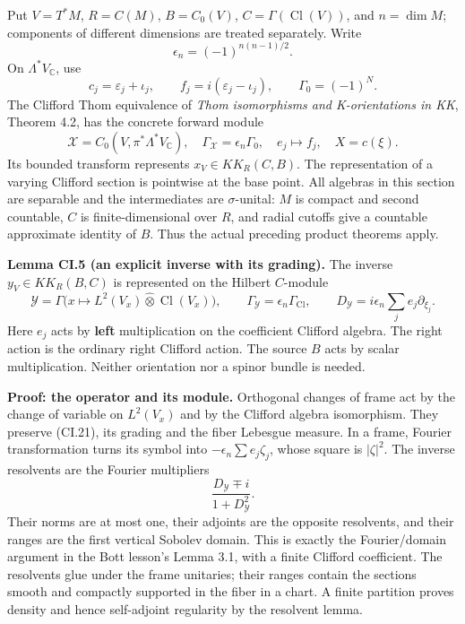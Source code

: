 \documentclass[
  11pt,
]{article}
\begin{document}
Put \(V=T^*M\), \(R=C(M)\), \(B=C_0(V)\),
\(C=\Gamma(\operatorname{Cl}(V))\), and \(n=\dim M\); components of
different dimensions are treated separately. Write \[
 \epsilon_n=(-1)^{n(n-1)/2}.
 \tag{CI.18}
\] On \(\Lambda^*V_{\mathbb C}\), use \[
 c_j=\varepsilon_j+\iota_j,\qquad
 f_j=i(\varepsilon_j-\iota_j),\qquad
 \Gamma_0=(-1)^N.
 \tag{CI.19}
\] The Clifford Thom equivalence of \emph{Thom isomorphisms and
K-orientations in KK}, Theorem 4.2, has the concrete forward module \[
 \mathcal X=C_0(V,\pi^*\Lambda^*V_{\mathbb C}),\quad
 \Gamma_{\mathcal X}=\epsilon_n\Gamma_0,\quad
 e_j\longmapsto f_j,\quad X=c(\xi).
 \tag{CI.20}
\] Its bounded transform represents \(x_V\in KK_R(C,B)\). The
representation of a varying Clifford section is pointwise at the base
point. All algebras in this section are separable and the intermediates
are \(\sigma\)-unital: \(M\) is compact and second countable, \(C\) is
finite-dimensional over \(R\), and radial cutoffs give a countable
approximate identity of \(B\). Thus the actual preceding product
theorems apply.

\textbf{Lemma CI.5 (an explicit inverse with its grading).} The inverse
\(y_V\in KK_R(B,C)\) is represented on the Hilbert \(C\)-module \[
 \mathcal Y=\Gamma\bigl(x\longmapsto L^2(V_x)\widehat\otimes
                    \operatorname{Cl}(V_x)\bigr),\qquad
 \Gamma_{\mathcal Y}=\epsilon_n\Gamma_{\operatorname{Cl}},
 \qquad
 D_{\mathcal Y}=i\epsilon_n\sum_j e_j\partial_{\xi_j}.
 \tag{CI.21}
\] Here \(e_j\) acts by \textbf{left} multiplication on the coefficient
Clifford algebra. The right action is the ordinary right Clifford
action. The source \(B\) acts by scalar multiplication. Neither
orientation nor a spinor bundle is needed.

\textbf{Proof: the operator and its module.} Orthogonal changes of frame
act by the change of variable on \(L^2(V_x)\) and by the Clifford
algebra isomorphism. They preserve (CI.21), its grading and the fiber
Lebesgue measure. In a frame, Fourier transformation turns its symbol
into \(-\epsilon_n\sum e_j\zeta_j\), whose square is \(|\zeta|^2\). The
inverse resolvents are the Fourier multipliers \[
 \frac{D_{\mathcal Y}\mp i}{1+D_{\mathcal Y}^2}.
\] Their norms are at most one, their adjoints are the opposite
resolvents, and their ranges are the first vertical Sobolev domain. This
is exactly the Fourier/domain argument in the Bott lesson's Lemma 3.1,
with a finite Clifford coefficient. The resolvents glue under the frame
unitaries; their ranges contain the sections smooth and compactly
supported in the fiber in a chart. A finite partition proves density and
hence self-adjoint regularity by the resolvent lemma.
\end{document}
